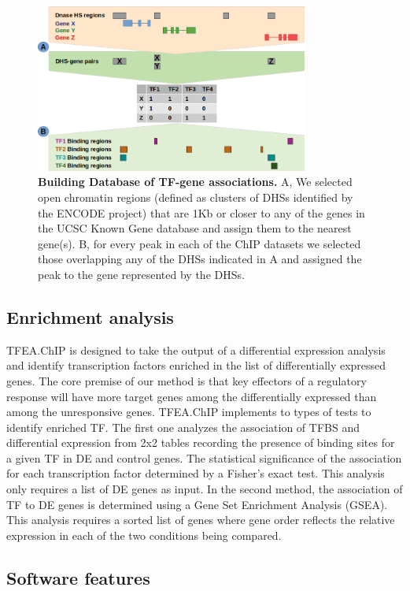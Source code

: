 \documentclass[10pt,letterpaper]{article}
\begin{document}
	\begin{figure}[h]
		\centering
		\includegraphics[width=0.8\textwidth]{fig2_LPO}
		\caption{{\bf Building Database of TF-gene associations.} A, We selected open chromatin regions (defined as clusters of DHSs identified by the ENCODE project) that are 1Kb or closer to any of the genes in the UCSC Known Gene database and assign them to the nearest gene(s). B, for every peak in each of the ChIP datasets we selected those overlapping any of the DHSs indicated in A and assigned the peak to the gene represented by the DHSs.}
		\label{fig1}
	\end{figure}
	
	\subsection*{Enrichment analysis}
	TFEA.ChIP is designed to take the output of a differential expression analysis and identify transcription factors enriched in the list of differentially expressed genes. The core premise of our method is that key effectors of a regulatory response will have more target genes among the differentially expressed than among the unresponsive genes. TFEA.ChIP implements to types of tests to identify enriched TF. The first one analyzes the association of TFBS and differential expression from 2x2 tables recording the presence of binding sites for a given TF in DE and control genes. The statistical significance of the association for each transcription factor determined by a Fisher’s exact test. This analysis only requires a list of DE genes as input. In the second method, the association of TF to DE genes is determined using a Gene Set Enrichment Analysis (GSEA)\cite{GSEA1}. This analysis requires a sorted list of genes where gene order reflects the relative expression in each of the two conditions being compared.
	
	\subsection*{Software features}
	
\end{document}
